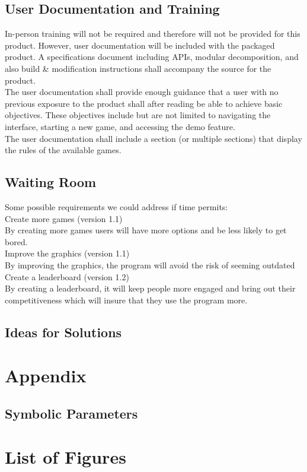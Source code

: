 \documentclass{article}
\begin{document}
		\subsection{User Documentation and Training}
		\indent \indent In-person training will not be required and therefore will not be provided for this product. However, user documentation will be included with the packaged product. A specifications document including APIs, modular decomposition, and also build & modification instructions shall accompany the source for the product.\\
 		\indent The user documentation shall provide enough guidance that a user with no previous exposure to the product shall after reading be able to achieve basic objectives. These objectives include but are not limited to navigating the interface, starting a new game, and accessing the demo feature.\\
 		\indent The user documentation shall include a section (or multiple sections) that display the rules of the available games.

		\subsection{Waiting Room}
		\indent Some possible requirements we could address if time permits:\\
		Create more games (version 1.1) \\
		By creating more games users will have more options and be less likely to get bored. \\
		Improve the graphics (version 1.1) \\
		By improving the graphics, the program will avoid the risk of seeming outdated \\
		Create a leaderboard (version 1.2)\\
		By creating a leaderboard, it will keep people more engaged and bring out their competitiveness which will insure that they use the program more. \\

		\subsection{Ideas for Solutions}
		
	\newpage
	\section*{Appendix}
	\subsection*{Symbolic Parameters}
	
	\newpage
	\section*{List of Figures}		
		
\end{document}
